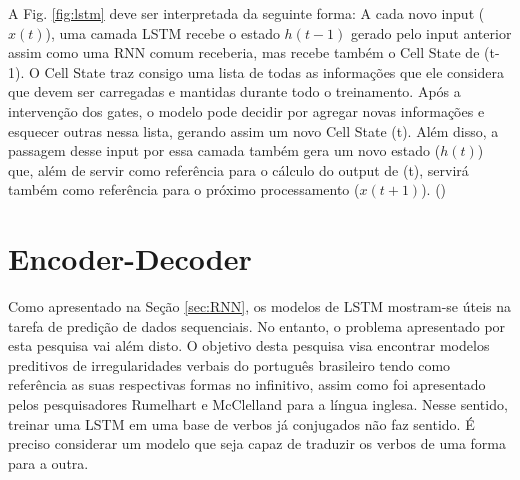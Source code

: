 

A Fig. \ref{fig:lstm} deve ser interpretada da seguinte forma: A cada novo input ($x(t)$), uma camada LSTM recebe o estado $h(t-1)$ gerado pelo input anterior assim como uma RNN comum receberia, mas recebe também o Cell State de (t-1). O Cell State traz consigo uma lista de todas as informações que ele considera que devem ser carregadas e mantidas durante todo o treinamento. Após a intervenção dos gates, o modelo pode decidir por agregar novas informações e esquecer outras nessa lista, gerando assim um novo Cell State (t). Além disso, a passagem desse input por essa camada também gera um novo estado ($h(t)$) que, além de servir como referência para o cálculo do output de (t), servirá também como referência para o próximo processamento ($x(t+1)$). (\cite{Goodfellow-et-al-2016})

\section{Encoder-Decoder}
\label{sec:enc-dec}

Como apresentado na Seção \ref{sec:RNN}, os modelos de LSTM mostram-se úteis na tarefa de predição de dados sequenciais. No entanto, o problema apresentado por esta pesquisa vai além disto. O objetivo desta pesquisa visa encontrar modelos preditivos de irregularidades verbais do português brasileiro tendo como referência as suas respectivas formas no infinitivo, assim como foi apresentado pelos pesquisadores Rumelhart e McClelland para a língua inglesa. Nesse sentido, treinar uma LSTM em uma base de verbos já conjugados não faz sentido. É preciso considerar um modelo que seja capaz de traduzir os verbos de uma forma para a outra. \\

